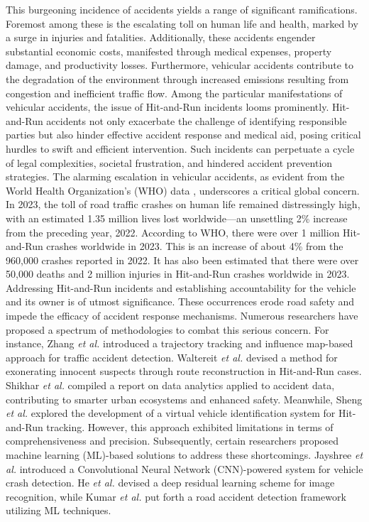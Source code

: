 \documentclass[10pt, conference, a4paper, compsocconf]{IEEEtran}
\begin{document}
\indent This burgeoning incidence of accidents yields a range of significant ramifications. Foremost among these is the escalating toll on human life and health, marked by a surge in injuries and fatalities. Additionally, these accidents engender substantial economic costs, manifested through medical expenses, property damage, and productivity losses. Furthermore, vehicular accidents contribute to the degradation of the environment through increased emissions resulting from congestion and inefficient traffic flow. Among the particular manifestations of vehicular accidents, the issue of Hit-and-Run incidents looms prominently. Hit-and-Run accidents not only exacerbate the challenge of identifying responsible parties but also hinder effective accident response and medical aid, posing critical hurdles to swift and efficient intervention. Such incidents can perpetuate a cycle of legal complexities, societal frustration, and hindered accident prevention strategies. The alarming escalation in vehicular accidents, as evident from the World Health Organization's (WHO) data \cite{WHO}, underscores a critical global concern. In 2023, the toll of road traffic crashes on human life remained distressingly high, with an estimated 1.35 million lives lost worldwide—an unsettling 2\% increase from the preceding year, 2022. According to WHO, there were over 1 million Hit-and-Run crashes worldwide in 2023. This is an increase of about 4\% from the 960,000 crashes reported in 2022. It has also been estimated that there were over 50,000 deaths and 2 million injuries in Hit-and-Run crashes worldwide in 2023.\\
\indent Addressing Hit-and-Run incidents and establishing accountability for the vehicle and its owner is of utmost significance. These occurrences erode road safety and impede the efficacy of accident response mechanisms. Numerous researchers have proposed a spectrum of methodologies to combat this serious concern. For instance, Zhang \emph{et al.} \cite{math11071743} introduced a trajectory tracking and influence map-based approach for traffic accident detection. Waltereit \emph{et al.} \cite{8730655} devised a method for exonerating innocent suspects through route reconstruction in Hit-and-Run cases. Shikhar \emph{et al.} \cite{7779365} compiled a report on data analytics applied to accident data, contributing to smarter urban ecosystems and enhanced safety. Meanwhile, Sheng \emph{et al.} \cite{9936747} explored the development of a virtual vehicle identification system for Hit-and-Run tracking. However, this approach exhibited limitations in terms of comprehensiveness and precision. Subsequently, certain researchers proposed machine learning (ML)-based solutions to address these shortcomings. Jayshree \emph{et al.} \cite{10053471} introduced a Convolutional Neural Network (CNN)-powered system for vehicle crash detection. He \emph{et al.} \cite{7780459} devised a deep residual learning scheme for image recognition, while Kumar \emph{et al.} \cite{9526546} put forth a road accident detection framework utilizing ML techniques.\\
\end{document}
